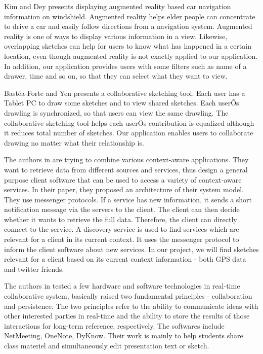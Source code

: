 \documentclass{article}
\begin{document}
Kim and Dey \cite{augmented_reality:kim} presents displaying augmented reality
based car navigation information on windshield. Augmented reality helps elder
people can concentrate to drive a car and easily follow directions from a
navigation system. Augmented reality is one of ways to display various
information in a view. Likewise, overlapping sketches can help for users to
know what has happened in a certain location, even though augmented reality is
not exactly applied to our application. In addition, our application provides
users with some filters such as name of a drawer, time and so on, so that they
can select what they want to view.

Bast\'{e}a-Forte and Yen \cite{brainstorming:marcello} presents a collaborative
sketching tool. Each user has a Tablet PC to draw some sketches and to view
shared sketches. Each userÕs drawling is synchronized, so that users can view
the same drawling. The collaborative sketching tool helps each userÕs
contribution is equalized although it reduces total number of sketches. Our
application enables users to collaborate drawing no matter what their
relationship is.

The authors in \cite{context:weis} are trying to combine various context-aware
applications. They want to retrieve data from different sources and services,
thus design a general purpose client software that can be used to access a
variety of context-aware services. In their paper, they proposed an
architecture of their system model. They use messenger protocols. If a service
has new information, it sends a short notification message via the servers to
the client. The client can then decide whether it wants to retrieve the full
data. Therefore, the client can directly connect to the service. A discovery
service is used to find services which are relevant for a client in its current
context. It uses the messenger protocol to inform the client software about new
services. In our project, we will find sketches relevant for a client based on
its current context information - both GPS data and twitter friends.

 The authors in \cite{ink:lindell} tested a few hardware and software
technologies in real-time collaborative system, basically raised two
fundamental principles - collaboration and persistence. The two principles
refer to the ability to communicate ideas with other interested parties in
real-time and the ability to store the results of those interactions for
long-term reference, respectively. The softwares include NetMeeting, OneNote,
DyKnow. Their work is mainly to help students share class materiel and
simultaneously edit presentation text or  sketch.
\end{document}
